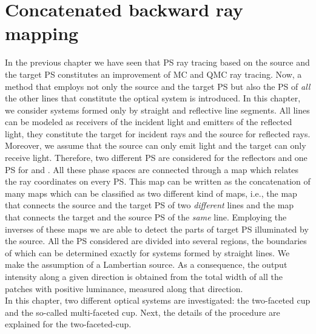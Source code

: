 \chapter{Concatenated backward ray mapping}\label{chap:raymapping1}
In the previous chapter we have seen that PS ray tracing based on the source and the target PS constitutes an improvement of MC and QMC ray tracing. 
Now, a method that employs not only the source and the target PS but also the PS of \textit{all} the other lines that constitute the optical system is introduced. 
In this chapter, we consider systems formed only by straight and reflective line segments.
All lines can be modeled as receivers of the incident light and emitters of the reflected light, they constitute
the target for incident rays and the source for reflected rays.
Moreover, we assume that the source can only emit light and the target can only receive light.
Therefore, two different PS are considered for the reflectors and one PS for
 and . All these phase spaces are connected through a map which relates the ray coordinates on every PS. This map can be written as the concatenation of many maps which can be classified as two different kind of maps, i.e., the map that connects the source and the target PS of two \textit{different} lines and the map that connects the target and the source PS of the \textit{same} line.
Employing the inverses of these maps we are able to detect the parts of target PS illuminated by the source.
All the PS considered are divided into several regions, the boundaries of which can be determined exactly for systems formed by straight lines.
We make the assumption of a Lambertian source.
As a consequence, the output intensity along a given direction is obtained from the total width of all the patches with positive luminance, measured along that direction.\\ \indent 
In this chapter, two different optical systems are investigated: the two-faceted cup and the so-called multi-faceted cup. Next, the details of the procedure are explained for the two-faceted-cup.
